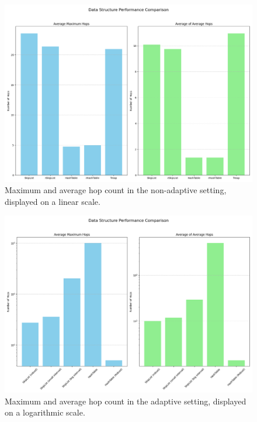 \begin{figure}
    \centering
    \includegraphics[width=\textwidth]{chapters/ch5_skipping/ch5_images/datastructure_performance.png}
    \caption[Non-adaptive PSDS Results.]{Maximum and average hop count in the non-adaptive setting, displayed on a linear scale.}
    \label{fig:runtimes_nonadaptive}
\end{figure}

\begin{figure}
    \centering
    \includegraphics[width=\textwidth]{chapters/ch5_skipping/ch5_images/adaptive_datastructure_performance.png}
    \caption[Adaptive PSDS Results.]{Maximum and average hop count in the adaptive setting, displayed on a logarithmic scale.}
    \label{fig:runtimes_adaptive}
\end{figure}


